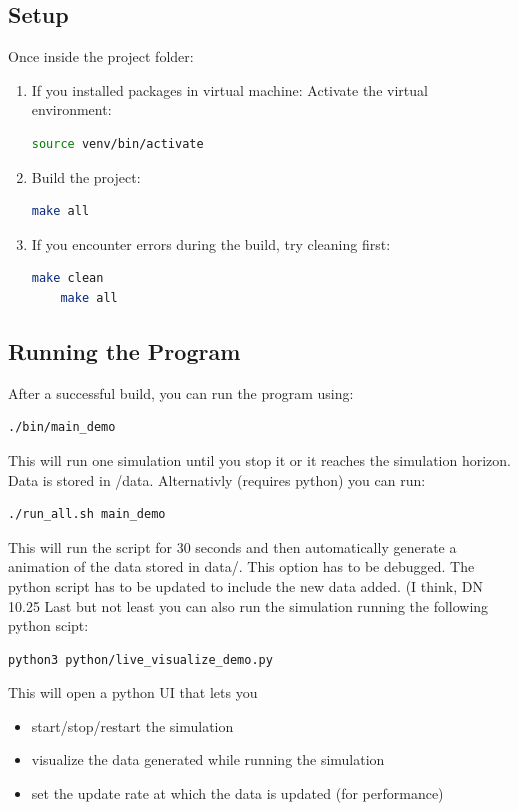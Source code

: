 \documentclass[11pt,a4paper]{article}
\newcommand{\Bemerkung}[1]{\color{red}#1\color{black}}
\begin{document}
\subsection{Setup}
Once inside the project folder:
\begin{enumerate}
    \item If you installed packages in virtual machine: Activate the virtual environment:
    \begin{lstlisting}[language=bash]
    source venv/bin/activate
    \end{lstlisting}

    \item Build the project:
    \begin{lstlisting}[language=bash]
    make all
    \end{lstlisting}

    \item If you encounter errors during the build, try cleaning first:
    \begin{lstlisting}[language=bash]
    make clean
    make all
    \end{lstlisting}
\end{enumerate}

\subsection{Running the Program}
After a successful build, you can run the program using:


\begin{lstlisting}[language=bash]
./bin/main_demo
\end{lstlisting}
This will run one simulation until you stop it or it reaches the simulation horizon. Data is stored in /data. Alternativly (requires python) you can run:
\begin{lstlisting}[language = bash]
./run_all.sh main_demo
\end{lstlisting}
This will run the script for 30 seconds and then automatically generate a animation of the data stored in data/. \Bemerkung{This option has to be debugged. The python script has to be updated to include the new data added. (I think, DN 10.25} 
Last but not least you can also run the simulation running the following python scipt:
\begin{lstlisting}[language=bash]
python3 python/live_visualize_demo.py \end{lstlisting}

This will open a python UI that lets you 
\begin{itemize}
    \item start/stop/restart the simulation 
    \item visualize the data generated while running the simulation 
    \item set the update rate at which the data is updated (for performance)
\end{itemize}
\end{document}
